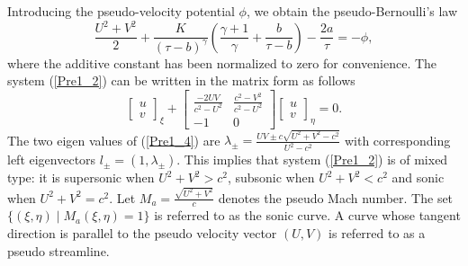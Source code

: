 \documentclass[3p,11pt]{elsarticle}
\numberwithin{equation}{section}
\begin{document}
Introducing the pseudo-velocity potential $\phi$, we obtain the pseudo-Bernoulli's law
\begin{equation}\label{Pre1_3}
    \frac{U^2+V^2}{2}+\frac{K}{(\tau-b)^{\gamma}}\left( \frac{\gamma+1}{\gamma}+\frac{b}{\tau-b}\right)-\frac{2a}{\tau} = -\phi,
\end{equation}
where the additive constant has been normalized to zero for convenience. The system (\ref{Pre1_2}) can be written in the matrix form as follows
\begin{equation}\label{Pre1_4}
   \begin{bmatrix}
       u \\ v
   \end{bmatrix}_\xi+ \begin{bmatrix}
       \frac{-2UV}{c^2-U^2} & \frac{c^2-V^2}{c^2-U^2}\\ -1 & 0
   \end{bmatrix} \begin{bmatrix}
       u \\ v
   \end{bmatrix}_\eta =0. 
\end{equation}
The two eigen values of (\ref{Pre1_4}) are $\lambda_\pm = \frac{UV\pm c\sqrt{U^2+V^2-c^2}}{U^2-c^2}$ with corresponding left eigenvectors $l_{\pm}=(1,\lambda_\pm)$. This implies that system (\ref{Pre1_2}) is of mixed type: it is supersonic when $U^2+V^2>c^2$, subsonic when $U^2+V^2<c^2$ and sonic when $U^2+V^2=c^2$. Let $M_a=\frac{\sqrt{U^2+V^2}}{c}$ denotes the pseudo Mach number. The set $\{(\xi,\eta) \;|\;M_a(\xi,\eta)=1 \}$ is referred to as the sonic curve. %
A curve whose tangent direction is parallel to the pseudo velocity vector $(U,V)$ is referred to as a pseudo streamline. 
\end{document}
